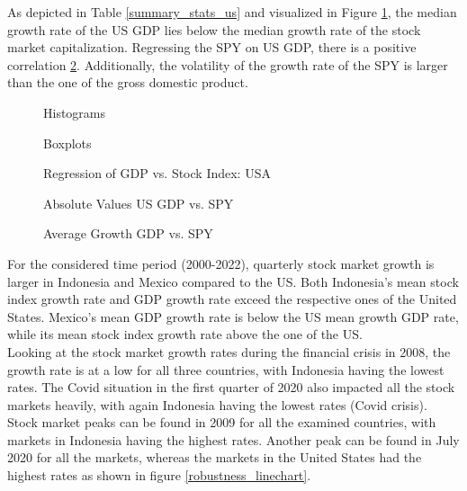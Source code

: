 \documentclass[12pt,a4paper,english]{article}
\begin{document}
As depicted in Table \ref{summary_stats_us} and visualized in Figure \ref{boxplot_us}, the median growth rate of the US GDP lies below the median growth rate of the stock market capitalization. Regressing the SPY on US GDP, there is a positive correlation \ref{regression_US}. Additionally, the volatility of the growth rate of the SPY is larger than the one of the gross domestic product.\\

\begin{figure}[H]
	\centering
	
	\caption{Histograms}
\end{figure}

\begin{figure}[H]
	\centering
	
	\caption{Boxplots}
    \label{boxplot_us}
\end{figure}

\begin{figure}[H]
	\centering
	
	\caption{Regression of GDP vs. Stock Index: USA}
    \label{regression_US}
\end{figure}

\begin{figure}[H]
	\centering
	
	\caption{Absolute Values US GDP vs. SPY}
    \label{absolute_us}
\end{figure}


\begin{figure}[H]
	\centering
	
	\caption{Average Growth GDP vs. SPY}
    \label{average_growth_us}
\end{figure}


For the considered time period (2000-2022), quarterly stock market growth is larger in Indonesia and Mexico compared to the US. Both Indonesia's mean stock index growth rate and GDP growth rate exceed the respective ones of the United States. Mexico's mean GDP growth rate is below the US mean growth GDP rate, while its mean stock index growth rate above the one of the US.\\


Looking at the stock market growth rates during the financial crisis in 2008, the growth rate is at a low for all three countries, with Indonesia having the lowest rates. The Covid situation in the first quarter of 2020 also impacted all the stock markets heavily, with again Indonesia having the lowest rates (Covid crisis). Stock market peaks can be found in 2009 for all the examined countries, with markets in Indonesia having the highest rates. Another peak can be found in July 2020 for all the markets, whereas the markets in the United States had the highest rates as shown in figure \ref{robustness_linechart}.\\
\end{document}
